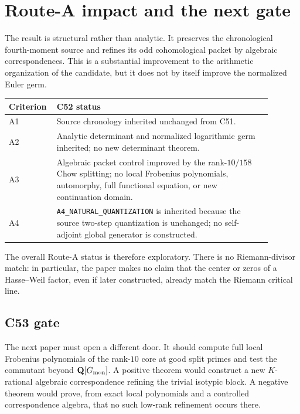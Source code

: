 \section{Route-A impact and the next gate}

The result is structural rather than analytic.  It preserves the
chronological fourth-moment source and refines its odd cohomological
packet by algebraic correspondences.  This is a substantial improvement
to the arithmetic organization of the candidate, but it does not by
itself improve the normalized Euler germ.

\begin{center}
\begin{tabular}{@{}p{0.12\linewidth}p{0.77\linewidth}@{}}
\toprule
Criterion & C52 status\\
\midrule
A1 & Source chronology inherited unchanged from C51.\\
A2 & Analytic determinant and normalized logarithmic germ inherited;
no new determinant theorem.\\
A3 & Algebraic packet control improved by the rank-\(10/158\) Chow
splitting; no local Frobenius polynomials, automorphy, full functional
equation, or new continuation domain.\\
A4 & \texttt{A4\_NATURAL\_QUANTIZATION} is inherited because the
source two-step quantization is unchanged; no self-adjoint global
generator is constructed.\\
\bottomrule
\end{tabular}
\end{center}

The overall Route-A status is therefore exploratory.  There is no
Riemann-divisor match: in particular, the paper makes no claim that the
center or zeros of a Hasse--Weil factor, even if later constructed,
already match the Riemann critical line.

\subsection{C53 gate}

The next paper must open a different door.  It should compute full local
Frobenius polynomials of the rank-\(10\) core at good split primes and
test the commutant beyond \(\mathbf Q[G_{\mathrm{mon}}]\).  A positive theorem would construct
a new \(K\)-rational algebraic correspondence refining the trivial
isotypic block.  A negative theorem would prove, from exact local
polynomials and a controlled correspondence algebra, that no such
low-rank refinement occurs there.

